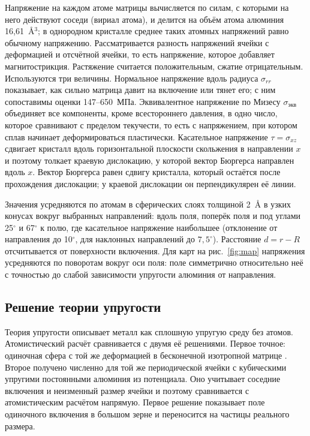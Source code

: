 \documentclass[11pt,a4paper]{article}
\begin{document}
Напряжение на каждом атоме матрицы вычисляется по силам, с которыми на
него действуют соседи (вириал атома), и делится на объём атома алюминия
16{,}61~\AA$^3$; в однородном кристалле среднее таких атомных напряжений
равно обычному напряжению. Рассматривается разность напряжений ячейки
с деформацией и отсчётной ячейки, то есть напряжение, которое добавляет
магнитострикция. Растяжение считается положительным, сжатие
отрицательным. Используются три величины. Нормальное напряжение вдоль
радиуса $\sigma_{rr}$ показывает, как сильно матрица давит на включение
или тянет его; с ним сопоставимы оценки 147--650~МПа. Эквивалентное
напряжение по Мизесу $\sigma_{\text{экв}}$ объединяет все компоненты,
кроме всестороннего давления, в одно число, которое сравнивают с пределом
текучести, то есть с напряжением, при котором сплав начинает
деформироваться пластически. Касательное напряжение $\tau=\sigma_{xz}$
сдвигает кристалл вдоль горизонтальной плоскости скольжения в направлении
$x$ и поэтому толкает краевую дислокацию, у которой вектор Бюргерса
направлен вдоль $x$. Вектор Бюргерса равен сдвигу кристалла, который
остаётся после прохождения дислокации; у краевой дислокации он
перпендикулярен её линии.

Значения усредняются по атомам в сферических слоях толщиной 2~\AA{}
в узких конусах вокруг выбранных направлений: вдоль поля, поперёк поля
и под углами 25$^\circ$ и 67$^\circ$ к полю, где касательное напряжение
наибольшее (отклонение от направления до 10$^\circ$, для наклонных
направлений до $7{,}5^\circ$). Расстояние $d=r-R$ отсчитывается от
поверхности включения. Для карт на рис.~\ref{fig:map} напряжения
усредняются по поворотам вокруг оси поля: поле симметрично относительно
неё с точностью до слабой зависимости упругости алюминия от направления.

\subsection{Решение теории упругости}

Теория упругости описывает металл как сплошную упругую среду без атомов.
Атомистический расчёт сравнивается с двумя её решениями. Первое точное:
одиночная сфера с той же деформацией в бесконечной изотропной матрице
\cite{Eshelby1957,Mura1987,JuSun1999}. Второе получено численно для той
же периодической ячейки \cite{MoulinecSuquet1998} с кубическими упругими
постоянными алюминия из потенциала. Оно учитывает соседние включения
и неизменный размер ячейки и поэтому сравнивается с атомистическим
расчётом напрямую. Первое решение показывает поле одиночного включения
в большом зерне и переносится на частицы реального размера.
\end{document}
